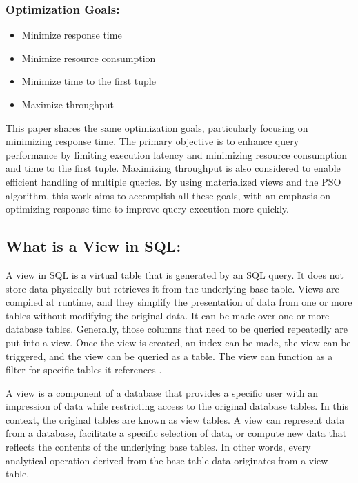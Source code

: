 \subsubsection*{Optimization Goals:}

\begin{itemize}
    \item Minimize response time
    \item Minimize resource consumption
    \item Minimize time to the first tuple
    \item Maximize throughput
\end{itemize}\vspace{.4cm}

This paper shares the same optimization goals, particularly focusing on minimizing response time. The primary objective is to enhance query performance by limiting execution latency and minimizing resource consumption and time to the first tuple. Maximizing throughput is also considered to enable efficient handling of multiple queries. By using materialized views and the PSO algorithm, this work aims to accomplish all these goals, with an emphasis on optimizing response time to improve query execution more quickly.



\subsection{What is a View in SQL:}
A view in SQL is a virtual table that is generated by an SQL query. It does not store data physically but retrieves it from the underlying base table. Views are compiled at runtime, and they simplify the presentation of data from one or more tables without modifying the original data. It can be made over one or more database tables. Generally, those columns that need to be queried repeatedly are put into a view. Once the view is created, an index can be made, the view can be triggered, and the view can be queried as a table. The view can function as a filter for specific tables it references \cite{chauhan-2024, Rohan_Vats-2024}.\vspace{.4cm}

A view is a component of a database that provides a specific user with an impression of data while restricting access to the original database tables. In this context, the original tables are known as view tables. A view can represent data from a database, facilitate a specific selection of data, or compute new data that reflects the contents of the underlying base tables. In other words, every analytical operation derived from the base table data originates from a view table.\vspace{.4cm}




